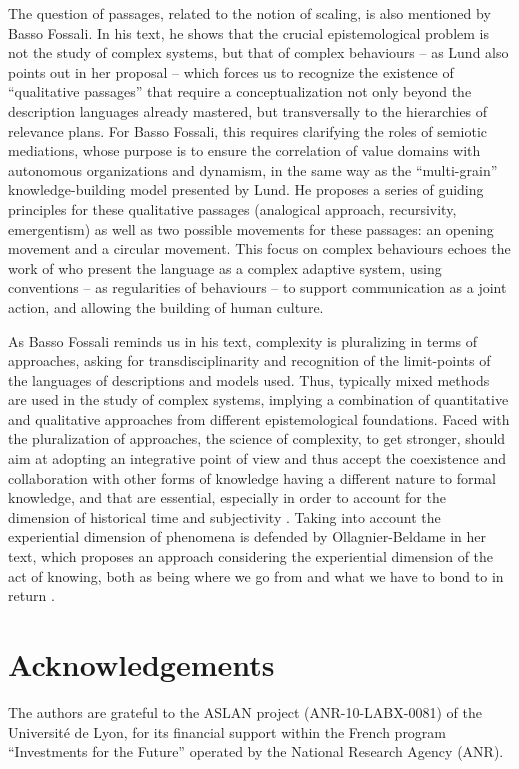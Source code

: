 \documentclass[output=paper]{langscibook}
\begin{document}
The question of passages, related to the notion of scaling, is also mentioned by Basso Fossali. In his text, he shows that the crucial epistemological problem is not the study of complex systems, but that of complex behaviours \citep{Prigogine1983} -- as Lund also points out in her proposal -- which forces us to recognize the existence of “qualitative passages” that require a conceptualization not only beyond the description languages ​​already mastered, but transversally to the hierarchies of relevance plans. For Basso Fossali, this requires clarifying the roles of semiotic mediations, whose purpose is to ensure the correlation of value domains with autonomous organizations and dynamism, in the same way as the “multi-grain” knowledge-building model presented by Lund. He proposes a series of guiding principles for these qualitative passages (analogical approach, recursivity, emergentism) as well as two possible movements for these passages: an opening movement and a circular movement. This focus on complex behaviours echoes the work of \citet{BecknerEtAl2009} who present the language as a complex adaptive system, using conventions -- as regularities of behaviours -- to support communication as a joint action, and allowing the building of human culture.

As Basso Fossali reminds us in his text, complexity is pluralizing in terms of approaches, asking for transdisciplinarity and recognition of the limit-points of the languages ​​of descriptions and models used. Thus, typically mixed methods are used in the study of complex systems, implying a combination of quantitative and qualitative approaches from different epistemological foundations. Faced with the pluralization of approaches, the science of complexity, to get stronger,  should aim at adopting an integrative point of view and thus accept the coexistence and collaboration with other forms of knowledge having a different nature to formal knowledge, and that are essential, especially in order to account for the dimension of historical time and subjectivity \citep{Israel2005}. Taking into account the experiential dimension of phenomena is defended by Ollagnier-Beldame in her text, which proposes an approach considering the experiential dimension of the act of knowing, both as being where we go from and what we have to bond to in return \citep[26]{Varela2017}.

\section*{Acknowledgements}
The authors are grateful to the ASLAN project (ANR-10-LABX-0081) of the Université de Lyon, for its financial support within the French program “Investments for the Future” operated by the National Research Agency (ANR).

{\sloppy\printbibliography[heading=subbibliography,notkeyword=this]}
\end{document}
